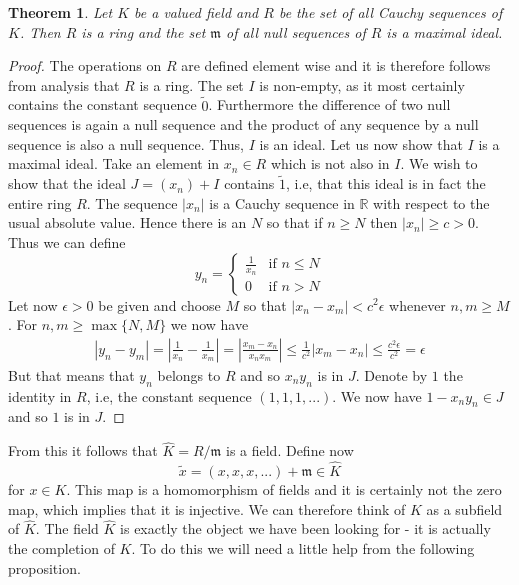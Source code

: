 \documentclass{article}
\newtheorem{theorem}{Theorem}[section]
\newcommand{\mfrak}[1]{\mathfrak{#1}}
\newcommand{\mbb}[1]{\mathbb{#1}}
\begin{document}
\begin{theorem}
    Let $K$ be a valued field and $R$ be the set of all Cauchy sequences of $K$. Then $R$ is a ring and the set $\mfrak m$ of all null sequences of $R$ is a maximal ideal.
\end{theorem}
\begin{proof}
    The operations on $R$ are defined element wise and it is therefore follows from analysis that $R$ is a ring. The set $I$ is non-empty, as it most certainly contains the constant sequence $\tilde 0$. Furthermore the difference of two null sequences is again a null sequence and the product of any sequence by a null sequence is also a null sequence. Thus, $I$ is an ideal. Let us now show that $I$ is a maximal ideal. Take an element in $x_n \in R$ which is not also in $I$. We wish to show that the ideal $J = (x_n) + I$ contains $\tilde 1$, i.e, that this ideal is in fact the entire ring $R$. The sequence $|x_n|$ is a Cauchy sequence in $\mbb R$ with respect to the usual absolute value. Hence there is an $N$ so that if $n \geq N$ then $|x_n| \geq c > 0$. Thus we can define 
    $$y_n = \begin{cases} \frac{1}{x_n} & \text{if } n \leq N \\ 0 & \text{if } n > N \end{cases}$$
    Let now $\epsilon > 0$ be given and choose $M$ so that $|x_n - x_m| < c^2 \epsilon$ whenever $n,m \geq M$. For $n,m \geq \max\{N,M\}$ we now have
    \begin{align*}
        |y_n - y_m| = |\frac{1}{x_n} - \frac{1}{x_m}| = |\frac{x_m - x_n}{x_n x_m}| \leq \frac{1}{c^2} |x_m - x_n| \leq \frac{c^2 \epsilon}{c^2} = \epsilon
    \end{align*}
    But that means that $y_n$ belongs to $R$ and so $x_n y_n$ is in $J$. Denote by $1$ the identity in $R$, i.e, the constant sequence $(1,1,1, ...)$. We now have $1 - x_n y_n \in J$ and so $1$ is in $J$.
\end{proof}

From this it follows that $\hat K = R / \mfrak m$ is a field. Define now $$\tilde x = (x,x,x,...) + \mfrak m \in \hat K$$ for $x \in K$. This map is a homomorphism of fields and it is certainly not the zero map, which implies that it is injective. We can therefore think of $K$ as a subfield of $\hat K$. The field $\hat K$ is exactly the object we have been looking for - it is actually the completion of $K$. To do this we will need a little help from the following proposition. 
\end{document}
